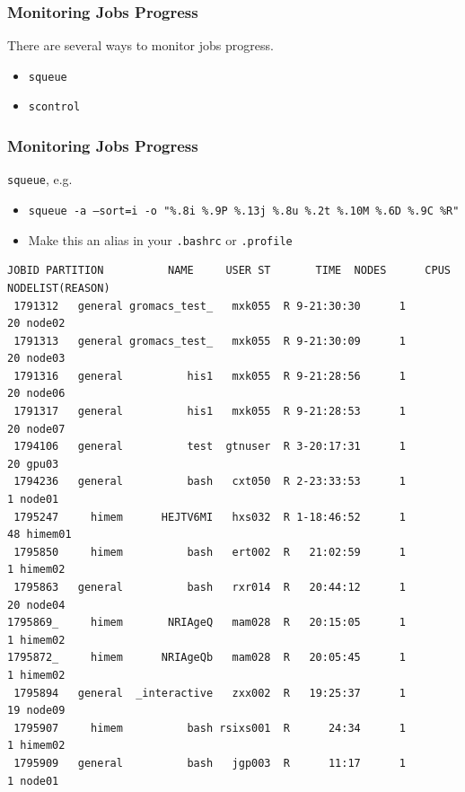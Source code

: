 \documentclass{beamer}
\newcommand{\code}[1]{\colorbox{codegray}{\texttt{#1}}}
\begin{document}
\begin{frame}
\frametitle{Monitoring Jobs Progress}
There are several ways to monitor jobs progress.  
\begin{itemize}
    \item \code{squeue}
    \pause
    \bigskip
    \item \code{scontrol}
\end{itemize}
\end{frame}


\begin{frame}[fragile]
\frametitle{Monitoring Jobs Progress}
\code{squeue}, e.g. 
\begin{itemize}
    \item \begingroup
          \tiny
            \code{squeue -a --sort=i -o "\%.8i \%.9P \%.13j \%.8u \%.2t \%.10M \%.6D \%.9C \%R"}
          \endgroup
    \item Make this an alias in your \code{.bashrc} or \code{.profile}
    \pause
    \bigskip
\end{itemize}
\begingroup
\tiny
\begin{lstlisting}[backgroundcolor = \color{codegray},showstringspaces=false]
   JOBID PARTITION          NAME     USER ST       TIME  NODES      CPUS NODELIST(REASON)
 1791312   general gromacs_test_   mxk055  R 9-21:30:30      1        20 node02
 1791313   general gromacs_test_   mxk055  R 9-21:30:09      1        20 node03
 1791316   general          his1   mxk055  R 9-21:28:56      1        20 node06
 1791317   general          his1   mxk055  R 9-21:28:53      1        20 node07
 1794106   general          test  gtnuser  R 3-20:17:31      1        20 gpu03
 1794236   general          bash   cxt050  R 2-23:33:53      1         1 node01
 1795247     himem      HEJTV6MI   hxs032  R 1-18:46:52      1        48 himem01
 1795850     himem          bash   ert002  R   21:02:59      1         1 himem02
 1795863   general          bash   rxr014  R   20:44:12      1        20 node04
1795869_     himem       NRIAgeQ   mam028  R   20:15:05      1         1 himem02
1795872_     himem      NRIAgeQb   mam028  R   20:05:45      1         1 himem02
 1795894   general  _interactive   zxx002  R   19:25:37      1        19 node09
 1795907     himem          bash rsixs001  R      24:34      1         1 himem02
 1795909   general          bash   jgp003  R      11:17      1         1 node01
\end{lstlisting}
\endgroup
\end{frame}
\end{document}
